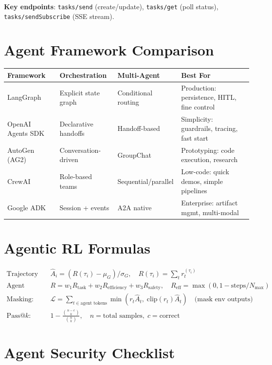\textbf{Key endpoints}: \texttt{tasks/send} (create/update), \texttt{tasks/get} (poll status), \texttt{tasks/sendSubscribe} (SSE stream).

\section{Agent Framework Comparison}
\label{agent-framework-comparison}

\begin{tabular}{@{}lp{3.5cm}p{3.5cm}p{6cm}@{}}
\toprule
\textbf{Framework} & \textbf{Orchestration} & \textbf{Multi-Agent} & \textbf{Best For} \\
\midrule
LangGraph & Explicit state graph & Conditional routing & Production: persistence, HITL, fine control \\
OpenAI Agents SDK & Declarative handoffs & Handoff-based & Simplicity: guardrails, tracing, fast start \\
AutoGen (AG2) & Conversation-driven & GroupChat & Prototyping: code execution, research \\
CrewAI & Role-based teams & Sequential/parallel & Low-code: quick demos, simple pipelines \\
Google ADK & Session + events & A2A native & Enterprise: artifact mgmt, multi-modal \\
\bottomrule
\end{tabular}

\section{Agentic RL Formulas}
\label{agentic-rl-formulas}

\begin{align}
\text{Trajectory GRPO:}&\quad \hat{A}_i = (R(\tau_i) - \mu_G)/\sigma_G, \quad R(\tau_i) = \sum_{t} r_t^{(\tau_i)} \\
\text{Agent reward:}&\quad R = w_1 R_\text{task} + w_2 R_\text{efficiency} + w_3 R_\text{safety}, \quad R_\text{eff} = \max(0, 1 - \text{steps}/N_\text{max}) \\
\text{Masking:}&\quad \mathcal{L} = \sum_{t \in \text{agent tokens}} \min(r_t \hat{A}_t,\; \text{clip}(r_t) \hat{A}_t) \quad \text{(mask env outputs)} \\
\text{Pass@}k:&\quad 1 - \frac{\binom{n-c}{k}}{\binom{n}{k}}, \quad n = \text{total samples},\; c = \text{correct}
\end{align}

\section{Agent Security Checklist}
\label{agent-security-checklist}

